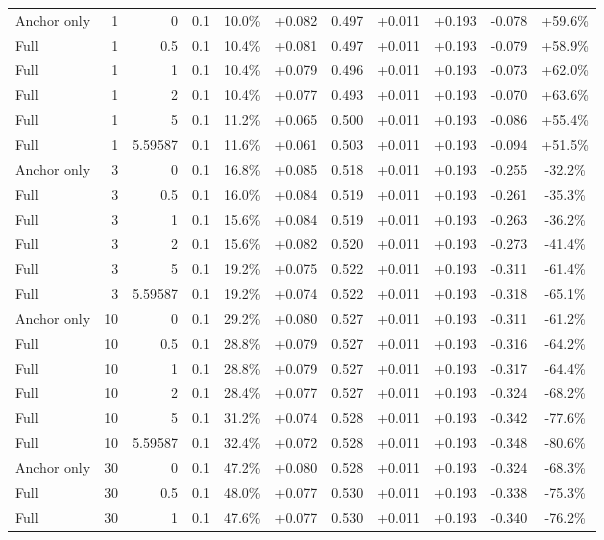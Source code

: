 \begin{table}[htbp]
\begin{tabular}{lrrrccccccc}
Anchor only & 1 & 0 & 0.1 & 10.0\% & +0.082 & 0.497 & +0.011 & +0.193 & -0.078 & +59.6\% \\
Full & 1 & 0.5 & 0.1 & 10.4\% & +0.081 & 0.497 & +0.011 & +0.193 & -0.079 & +58.9\% \\
Full & 1 & 1 & 0.1 & 10.4\% & +0.079 & 0.496 & +0.011 & +0.193 & -0.073 & +62.0\% \\
Full & 1 & 2 & 0.1 & 10.4\% & +0.077 & 0.493 & +0.011 & +0.193 & -0.070 & +63.6\% \\
Full & 1 & 5 & 0.1 & 11.2\% & +0.065 & 0.500 & +0.011 & +0.193 & -0.086 & +55.4\% \\
Full & 1 & 5.59587 & 0.1 & 11.6\% & +0.061 & 0.503 & +0.011 & +0.193 & -0.094 & +51.5\% \\
Anchor only & 3 & 0 & 0.1 & 16.8\% & +0.085 & 0.518 & +0.011 & +0.193 & -0.255 & -32.2\% \\
Full & 3 & 0.5 & 0.1 & 16.0\% & +0.084 & 0.519 & +0.011 & +0.193 & -0.261 & -35.3\% \\
Full & 3 & 1 & 0.1 & 15.6\% & +0.084 & 0.519 & +0.011 & +0.193 & -0.263 & -36.2\% \\
Full & 3 & 2 & 0.1 & 15.6\% & +0.082 & 0.520 & +0.011 & +0.193 & -0.273 & -41.4\% \\
Full & 3 & 5 & 0.1 & 19.2\% & +0.075 & 0.522 & +0.011 & +0.193 & -0.311 & -61.4\% \\
Full & 3 & 5.59587 & 0.1 & 19.2\% & +0.074 & 0.522 & +0.011 & +0.193 & -0.318 & -65.1\% \\
Anchor only & 10 & 0 & 0.1 & 29.2\% & +0.080 & 0.527 & +0.011 & +0.193 & -0.311 & -61.2\% \\
Full & 10 & 0.5 & 0.1 & 28.8\% & +0.079 & 0.527 & +0.011 & +0.193 & -0.316 & -64.2\% \\
Full & 10 & 1 & 0.1 & 28.8\% & +0.079 & 0.527 & +0.011 & +0.193 & -0.317 & -64.4\% \\
Full & 10 & 2 & 0.1 & 28.4\% & +0.077 & 0.527 & +0.011 & +0.193 & -0.324 & -68.2\% \\
Full & 10 & 5 & 0.1 & 31.2\% & +0.074 & 0.528 & +0.011 & +0.193 & -0.342 & -77.6\% \\
Full & 10 & 5.59587 & 0.1 & 32.4\% & +0.072 & 0.528 & +0.011 & +0.193 & -0.348 & -80.6\% \\
Anchor only & 30 & 0 & 0.1 & 47.2\% & +0.080 & 0.528 & +0.011 & +0.193 & -0.324 & -68.3\% \\
Full & 30 & 0.5 & 0.1 & 48.0\% & +0.077 & 0.530 & +0.011 & +0.193 & -0.338 & -75.3\% \\
Full & 30 & 1 & 0.1 & 47.6\% & +0.077 & 0.530 & +0.011 & +0.193 & -0.340 & -76.2\% \\

\end{tabular}
\end{table}
